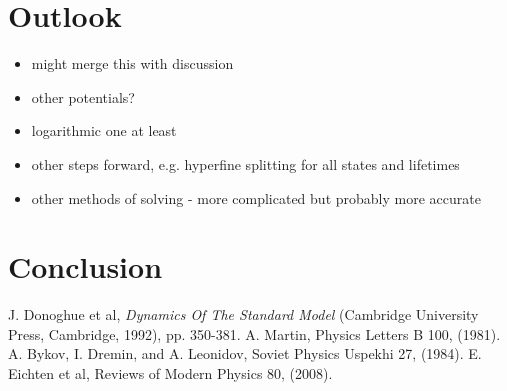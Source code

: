 \documentclass[10pt, twocolumn]{article}
\begin{document}
\section{Outlook}
\begin{itemize}
    \item might merge this with discussion
    \item other potentials?
    \item logarithmic one at least
    \item other steps forward, e.g. hyperfine splitting for all states and lifetimes
    \item other methods of solving - more complicated but probably more accurate
\end{itemize}

\section{Conclusion}

\begin{thebibliography}{}
     J. Donoghue et al, \textit{Dynamics Of The Standard Model} (Cambridge University Press, Cambridge, 1992), pp. 350-381.
     A. Martin, Physics Letters B 100, (1981).
     A. Bykov, I. Dremin, and A. Leonidov, Soviet Physics Uspekhi 27, (1984).
     E. Eichten et al, Reviews of Modern Physics 80, (2008).
\end{thebibliography}
\end{document}

